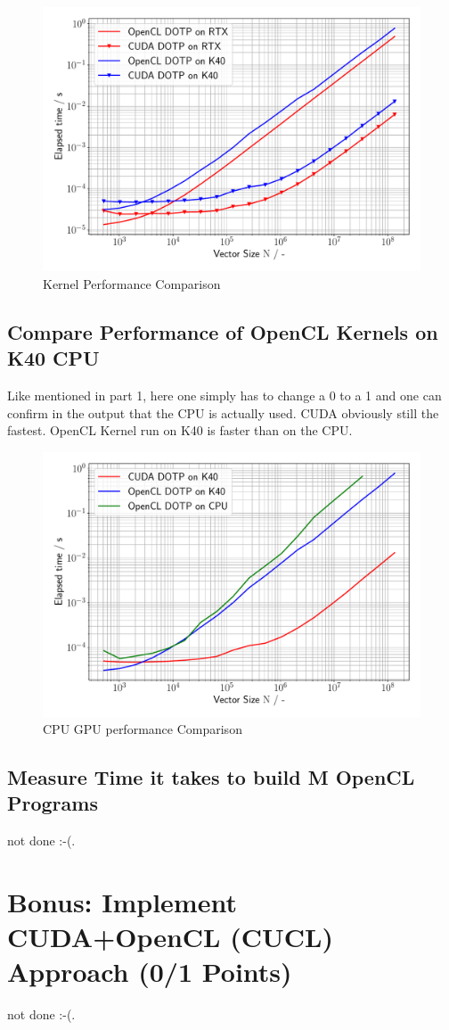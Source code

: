 \begin{figure}[h]
    \begin{center}
        \includegraphics[width = \linewidth]{figures/task_8_2_plot.pdf}
        \caption{Kernel Performance Comparison}
        \end{center}
\end{figure}

\pagebreak
\subsection{Compare Performance of OpenCL Kernels on K40 CPU}
Like mentioned in part 1, here one simply has to change a 0 to a 1 and one can confirm in the output that the CPU is actually used.
CUDA obviously still the fastest. OpenCL Kernel run on K40 is faster than on the CPU.

\begin{figure}[h]
    \begin{center}
        \includegraphics[width = \linewidth]{figures/task_8_3_plot.pdf}
        \caption{CPU GPU performance Comparison}
        \end{center}
\end{figure}
\pagebreak

\subsection{Measure Time it takes to build M OpenCL Programs}
not done :-(.


\pagebreak
\section{Bonus: Implement CUDA+OpenCL (CUCL) Approach (0/1 Points)}
not done :-(.
